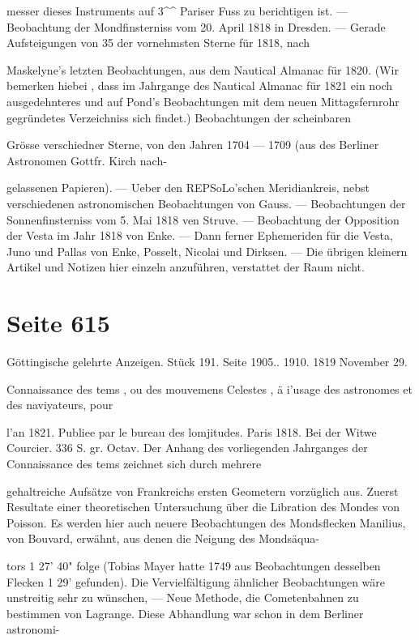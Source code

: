 \documentclass[10pt,a4paper]{article}
\begin{document}
messer dieses Instruments auf 3\textasciicircum{}\textasciicircum{} Pariser Fuss zu berichtigen ist. — Beobachtung der Mondfinsterniss vom 20. April 1818 in Dresden. — Gerade Aufsteigungen von 35 der vornehmsten Sterne für 1818, nach

Maskelyne's letzten Beobachtungen, aus dem Nautical Almanac für 1820. (Wir bemerken hiebei , dass im Jahrgange des Nautical Almanac für 1821 ein noch ausgedehnteres und auf Pond's Beobachtungen mit dem neuen Mittagsfernrohr gegründetes Verzeichniss sich findet.) Beobachtungen der scheinbaren

Grösse verschiedner Sterne, von den Jahren 1704 — 1709 (aus des Berliner Astronomen Gottfr. Kirch nach-

gelassenen Papieren). — Ueber den REPSoLo'schen Meridiankreis, nebst verschiedenen astronomischen Beobachtungen von Gauss. — Beobachtungen der Sonnenfinsterniss vom 5. Mai 1818 ven Struve. — Beobachtung der Opposition der Vesta im Jahr 1818 von Enke. — Dann ferner Ephemeriden für die Vesta, Juno und Pallas von Enke, Posselt, Nicolai und Dirksen. — Die übrigen kleinern Artikel und Notizen hier einzeln anzuführen, verstattet der Raum nicht.


\newpage
\section*{Seite 615}
Göttingische gelehrte Anzeigen. Stück 191. Seite 1905.. 1910. 1819 November 29.

Connaissance des tems , ou des mouvemens Celestes , ä i'usage des astronomes et des naviyateurs, pour

l'an 1821. Publiee par le bureau des lomjitudes. Paris 1818. Bei der Witwe Courcier. 336 S. gr. Octav. Der Anhang des vorliegenden Jahrganges der Connaissance des tems zeichnet sich durch mehrere

gehaltreiche Aufsätze von Frankreichs ersten Geometern vorzüglich aus. Zuerst Resultate einer theoretischen Untersuchung über die Libration des Mondes von Poisson. Es werden hier auch neuere Beobachtungen des Mondsflecken Manilius, von Bouvard, erwähnt, aus denen die Neigung des Mondsäqua-

tors 1\textdegree{} 27' 40" folge (Tobias Mayer hatte 1749 aus Beobachtungen desselben Flecken 1\textdegree{} 29' gefunden). Die Vervielfältigung ähnlicher Beobachtungen wäre unstreitig sehr zu wünschen, — Neue Methode, die Cometenbahnen zu bestimmen von Lagrange. Diese Abhandlung war schon in dem Berliner astronomi-
\end{document}
